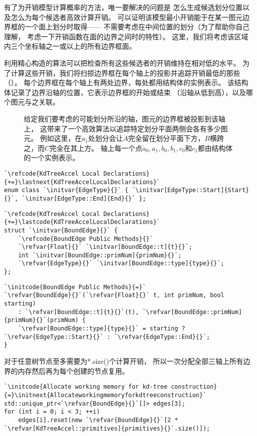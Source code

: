 有了为开销模型计算概率的方法，唯一要解决的问题是
怎么生成候选划分位置以及怎么为每个候选者高效计算开销。
可以证明该模型最小开销能于在某一图元边界框的一个面上划分时取得——
不需要考虑在中间位置的划分（为了帮助你自己理解，
考虑一下开销函数在面的边界之间时的特性）。
这里，我们将考虑该区域内三个坐标轴之一或以上的所有边界框面。

利用精心构造的算法可以把检查所有这些候选者的开销维持在相对低的水平。
为了计算这些开销，我们将扫掠边界框在每个轴上的投影并追踪开销最低的那些（）。
每个边界框在每个轴上有两处边界，每处都用结构体的实例表示。
该结构体记录了边界沿轴的位置，它表示边界框的开始或结束
（沿轴从低到高），以及哪个图元与之关联。
\begin{figure}[htbp]
    \centering
    \caption{给定我们要考虑的可能划分所沿的轴，图元的边界框被投影到该轴上，
    这带来了一个高效算法以追踪特定划分平面两侧会各有多少图元。
    例如这里，在$a_1$处划分会让$A$完全留在划分平面下方，$B$横跨之，而$C$完全在其上方。
    轴上每一个点$a_0,a_1,b_0,b_1,c_0$和$c_1$都由结构体的一个实例表示。}
    \label{fig:4.15}
\end{figure}
\begin{lstlisting}
`\refcode{KdTreeAccel Local Declarations}{+=}\lastnext{KdTreeAccelLocalDeclarations}`
enum class `\initvar{EdgeType}{}` { `\initvar[EdgeType::Start]{Start}{}`, `\initvar[EdgeType::End]{End}{}` };
\end{lstlisting}
\begin{lstlisting}
`\refcode{KdTreeAccel Local Declarations}{+=}\lastcode{KdTreeAccelLocalDeclarations}`
struct `\initvar{BoundEdge}{}` {
    `\refcode{BoundEdge Public Methods}{}`
    `\refvar{Float}{}` `\initvar[BoundEdge::t]{t}{}`;
    int `\initvar[BoundEdge::primNum]{primNum}{}`;
    `\refvar{EdgeType}{}` `\initvar[BoundEdge::type]{type}{}`;
};
\end{lstlisting}
\begin{lstlisting}
`\initcode{BoundEdge Public Methods}{=}`
`\refvar{BoundEdge}{}`(`\refvar{Float}{}` t, int primNum, bool starting)
    : `\refvar[BoundEdge::t]{t}{}`(t), `\refvar[BoundEdge::primNum]{primNum}{}`(primNum) {
    `\refvar[BoundEdge::type]{type}{}` = starting ? `\refvar{EdgeType::Start}{}` : `\refvar{EdgeType::End}{}`; 
}
\end{lstlisting}

对于任意树节点至多需要为{*.size()}个计算开销，
所以一次分配全部三轴上所有边界的内存然后再为每个创建的节点复用。
\begin{lstlisting}
`\initcode{Allocate working memory for kd-tree construction}{=}\initnext{Allocateworkingmemoryforkdtreeconstruction}`
std::unique_ptr<`\refvar{BoundEdge}{}`[]> edges[3];
for (int i = 0; i < 3; ++i)
    edges[i].reset(new `\refvar{BoundEdge}{}`[2 * `\refvar[KdTreeAccel::primitives]{primitives}{}`.size()]);
\end{lstlisting}

